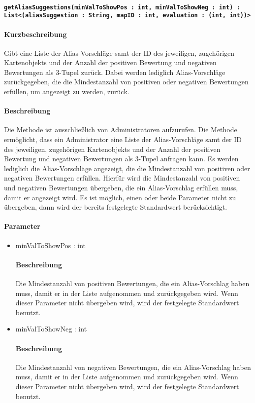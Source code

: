 \paragraph{\texttt{getAliasSuggestions(minValToShowPos : int, minValToShowNeg : int) : List<(aliasSuggestion : String, mapID : int, evaluation : (int, int))>}}%
\paragraph*{Kurzbeschreibung}
Gibt eine Liste der Alias-Vorschläge samt der ID des jeweiligen, zugehörigen Kartenobjekts und der Anzahl der positiven Bewertung und negativen Bewertungen als 3-Tupel zurück. Dabei werden lediglich Alias-Vorschläge zurückgegeben, die die Mindestanzahl von positiven oder negativen Bewertungen erfüllen, um angezeigt zu werden, zurück.
\paragraph*{Beschreibung}
Die Methode ist ausschließlich von Administratoren aufzurufen.
Die Methode ermöglicht, dass ein Administrator eine Liste der Alias-Vorschläge samt der ID des jeweiligen, zugehörigen Kartenobjekts und der Anzahl der positiven Bewertung und negativen Bewertungen als 3-Tupel anfragen kann. 
Es werden lediglich die Alias-Vorschläge angezeigt, die die Mindestanzahl von positiven oder negativen Bewertungen erfüllen.
Hierfür wird die Mindestanzahl von positiven und negativen Bewertungen übergeben, die ein Alias-Vorschlag erfüllen muss, damit er angezeigt wird.
Es ist möglich, einen oder beide Parameter nicht zu übergeben, dann wird der bereits festgelegte Standardwert berücksichtigt.
\paragraph*{Parameter}
\begin{itemize}
	\item minValToShowPos : int
		\paragraph*{Beschreibung}
		Die Mindestanzahl von positiven Bewertungen, die ein Alias-Vorschlag haben muss, damit er in der Liste aufgenommen und zurückgegeben wird.
		Wenn dieser Parameter nicht übergeben wird, wird der festgelegte Standardwert benutzt.
	\item minValToShowNeg : int
		\paragraph*{Beschreibung}
		Die Mindestanzahl von negativen Bewertungen, die ein Alias-Vorschlag haben muss, damit er in der Liste aufgenommen und zurückgegeben wird. 
		Wenn dieser Parameter nicht übergeben wird, wird der festgelegte Standardwert benutzt.
\end{itemize}

